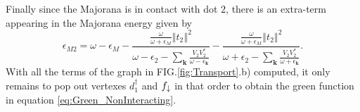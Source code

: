 \documentclass[showpacs,aps,prb,reprint,superscriptaddress]{revtex4-1}
\begin{document}
Finally since the Majorana is in contact with dot $2$, there is an extra-term appearing in the  Majorana energy given by 
\begin{equation}
    \epsilon_{M2}=\omega-\epsilon_{M}-\frac{\frac{\omega}{\omega+\epsilon_{M}}\left\Vert t_{2}\right\Vert ^{2} } {\omega-\epsilon_{2}-\sum_{\mathbf{k}}\frac{V_{2}V_{2}^{*}}{\omega-\epsilon_{\mathbf{k}}}}-\frac{\frac{\omega}{\omega+\epsilon_{M}}\left\Vert t_{2}\right\Vert ^{2}}{\omega+\epsilon_{2}-\sum_{\mathbf{k}}\frac{V_{2}V_{2}^{*}}{\omega+\epsilon_{\mathbf{k}}}}. \label{eq:M2}
\end{equation}
With all the terms of the graph in FIG.\ref{fig:Transport}.b) computed, it only remains to pop out vertexes $d^\dagger_1$ and $f_\downarrow$ in that order to obtain the green function in equation \eqref{eq:Green_NonInteracting}. 













 



\end{document}

